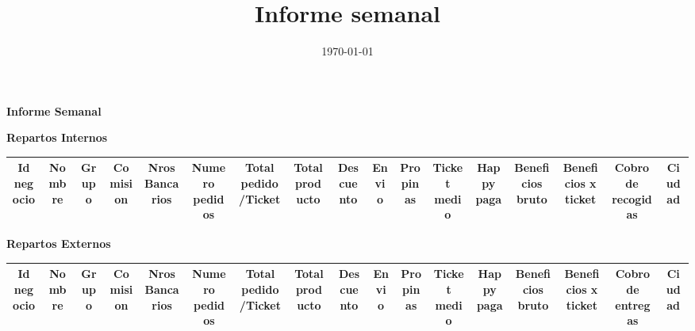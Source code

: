 \documentclass[legalpaper,landscape]{article}
\title{Informe semanal}
\date{\today}
\author{}
\begin{document}
\vspace{10mm}
\centering
\begin{LARGE}
\textbf{Informe Semanal}

\vspace{2mm}

\end{LARGE}

\vspace{10mm}


\Huge \textbf {Repartos Internos}
\begin{table}[htbp]
\centering
\begin{adjustbox}{width=1\textwidth}
\begin{tabular}{c|c||c|c|c|c|c|c|c|c|c|c|c|c|c|c|c|}
\hline
\rowcolor{int}
 Id negocio & Nombre & Grupo  & Comision & Nros Bancarios & Numero pedidos & Total pedido/Ticket & Total producto & Descuento & Envio & Propinas  & Ticket medio & Happy paga &	Beneficios bruto & Beneficios x ticket & Cobro de recogidas & Ciudad \\
\hline\hline
\hline
\end{tabular}
\end{adjustbox}
\end{table}

\vspace{5mm}

\Huge \textbf {Repartos Externos}
\begin{table}[htbp]
\centering
\begin{adjustbox}{width=1\textwidth}
\begin{tabular}{c|c||c|c|c|c|c|c|c|c|c|c|c|c|c|c|c|}
\hline
\rowcolor{ext}
 Id negocio & Nombre & Grupo  & Comision & Nros Bancarios & Numero pedidos & Total pedido/Ticket & Total producto & Descuento & Envio & Propinas  & Ticket medio & Happy paga &	Beneficios bruto &	Beneficios x ticket & Cobro de entregas & Ciudad \\
\hline\hline
\hline
\end{tabular}
\end{adjustbox}
\end{table}


\vspace{5mm}
\end{document}
